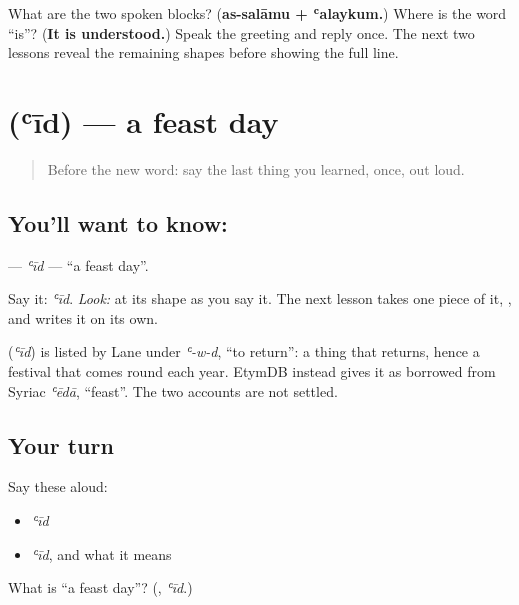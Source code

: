 \begin{tcolorbox}[breakable,colback=teal!4,colframe=teal!35!black,title={Before you move on}]
What are the two spoken blocks? (\textbf{as-salāmu + ʿalaykum.}) Where is the word “is”? (\textbf{It is understood.}) Speak the greeting and reply once. The next two lessons reveal the remaining shapes before showing the full line.
\end{tcolorbox}
\section[\texorpdfstring{\ar{عيد} (ʿīd)}{عيد (ʿīd)}]{ (ʿīd) — a feast day}

\label{lesson:AR-C01-iid}



\begin{quote}
Before the new word: say the last thing you learned, once, out loud.
\end{quote}

\subsection*{You'll want to know: }
\textbf{} — \emph{ʿīd} — \textquotedblleft{}a feast day\textquotedblright{}.

Say it: \emph{ʿīd}. \emph{Look:} at its shape as you say it. The next lesson takes one piece of it, \textbf{ }, and writes it on its own.

\begin{cousinweb}
\textbf{} (\emph{ʿīd}) is listed by Lane under \emph{ʿ-w-d}, \textquotedblleft{}to return\textquotedblright{}: a thing that returns, hence a festival that comes round each year. EtymDB instead gives it as borrowed from Syriac \emph{ʿēdā}, \textquotedblleft{}feast\textquotedblright{}. The two accounts are not settled.
\end{cousinweb}

\subsection*{Your turn}
Say these aloud:

\begin{itemize}
\raggedright
  \item \emph{ʿīd}
  \item \emph{ʿīd}, and what it means
\end{itemize}

\begin{tcolorbox}[breakable,colback=teal!4,colframe=teal!35!black,title={Before you move on}]
What is \textquotedblleft{}a feast day\textquotedblright{}? (\textbf{}, \emph{ʿīd}.)
\end{tcolorbox}
